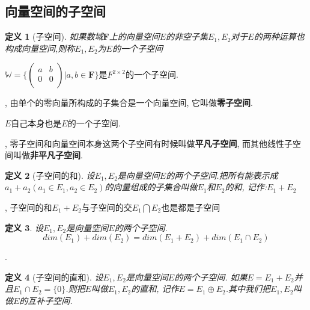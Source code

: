 \documentclass[a4paper,11pt]{book}
\newtheorem{definition}{\hspace{2em}定义}[section]
\begin{document}
\subsection*{向量空间的子空间}
\begin{definition}[子空间]
  如果数域$\mathbf{F}$上的向量空间$E$的非空子集$E_1,E_2$对于$E$的两种运算也构成向量空间,则称$E_1,E_2$为$E$的一个子空间
\end{definition}
$\mathbb{W}=\{\begin{pmatrix}
                       a & b \\
                       0 & 0 \\
                     \end{pmatrix}
|a,b\in \mathbf{F}\}$是$F^{2\times 2}$的一个子空间.

, 由单个的零向量所构成的子集合是一个向量空间, 它叫做\textbf{零子空间}.

$E$自己本身也是$E$的一个子空间.

, 零子空间和向量空间本身这两个子空间有时候叫做\textbf{平凡子空间}, 而其他线性子空间叫做\textbf{非平凡子空间}.
\begin{definition}[子空间的和]
  设$E_1,E_2$是向量空间$E$的两个子空间.把所有能表示成$a_1+a_2(a_1\in E_1,a_2\in E_2)$的向量组成的子集合叫做$E_1$和$E_2$的和, 记作:$E_1+E_2$
\end{definition}
, 子空间的和$E_1+E_2$与子空间的交$E_1\bigcap E_2$也是都是子空间
\begin{definition}
  设$E_1,E_2$是向量空间$E$的两个子空间.
  \begin{equation*}
    dim(E_1)+dim(E_2)=dim(E_1+E_2)+dim(E_1\cap E_2)
  \end{equation*}
\end{definition}
.
\begin{definition}[子空间的直和]
  设$E_1,E_2$是向量空间$E$的两个子空间. 如果$E=E_1+E_2$并且$E_1\cap E_2=\{0\}$.则把$E$叫做$E_1,E_2$的直和, 记作$E=E_1\oplus E_2$.其中我们把$E_1,E_2$叫做$E$的互补子空间.
\end{definition}
\end{document}
